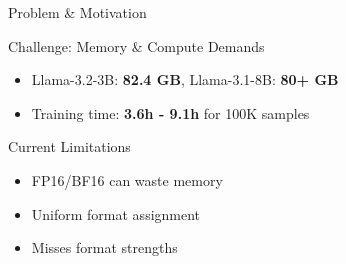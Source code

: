 \begin{frame}[squeeze]{Problem \& Motivation}

\begin{block}{Challenge: Memory \& Compute Demands}
\small
\begin{itemize}
    \item Llama-3.2-3B: \textbf{82.4 GB}, Llama-3.1-8B: \textbf{80+ GB}
    \item Training time: \textbf{3.6h - 9.1h} for 100K samples
\end{itemize}
\end{block}

\vspace{0.1cm}

\begin{block}{Current Limitations}
\small
\begin{itemize}
    \item FP16/BF16 can waste memory
    \item Uniform format assignment
    \item Misses format strengths
\end{itemize}
\end{block}


\end{frame}
